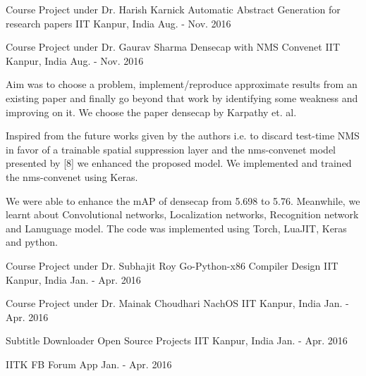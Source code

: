 \begin{cventries}
	\cventry
	{Course Project under Dr. Harish Karnick} %
	{Automatic Abstract Generation for research papers} %
	{IIT Kanpur, India} %
	{Aug. - Nov. 2016} %
	{
		\begin{cvitems} %
		\end{cvitems}
	}
	
	\cventry
	{Course Project under Dr. Gaurav Sharma} %
	{Densecap with NMS Convenet} %
	{IIT Kanpur, India} %
	{Aug. - Nov. 2016} %
	{
		\begin{cvitems} %
			\item Aim was to choose a problem, implement/reproduce approximate results from an existing paper and finally go beyond that work by identifying some weakness and improving on it. We choose the paper densecap by Karpathy et. al.
			\item Inspired from the future works given by the authors i.e. to discard test-time NMS in favor of a trainable spatial suppression layer and the nms-convenet model presented by [8] we enhanced the proposed model. We implemented and trained the nms-convenet using Keras. 
			\item We were able to enhance the mAP of densecap from 5.698 to 5.76. Meanwhile, we learnt about Convolutional networks, Localization networks, Recognition network and Lanuguage model. The code was implemented using Torch, LuaJIT, Keras and python. 
		\end{cvitems}
	}
	
	\cventry
	{Course Project under Dr. Subhajit Roy} %
	{Go-Python-x86 Compiler Design} %
	{IIT Kanpur, India} %
	{Jan. - Apr. 2016} %
	{
		\begin{cvitems} %
		\end{cvitems}
	}
	
	\cventry
	{Course Project under Dr. Mainak Choudhari} %
	{NachOS} %
	{IIT Kanpur, India} %
	{Jan. - Apr. 2016} %
	{
		\begin{cvitems} %
		\end{cvitems}
	}
	
	\cventry
	{Subtitle Downloader} %
	{Open Source Projects} %
	{IIT Kanpur, India} %
	{Jan. - Apr. 2016} %
	{
		\begin{cvitems} %
		\end{cvitems}
	}
	
	\cventry
	{IITK FB Forum App} %
	{} %
	{} %
	{Jan. - Apr. 2016} %
	{
		\begin{cvitems} %
		\end{cvitems}
	}
\end{cventries}